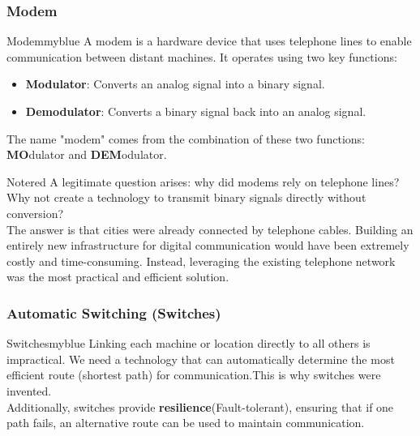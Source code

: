 \vspace{0.25cm}

\subsubsection{Modem}  
\begin{prettyBox}{Modem}{myblue}  
A modem is a hardware device that uses telephone lines to enable communication
between distant machines. It operates using two key functions:  

\begin{itemize}  
    \item \textbf{Modulator}: Converts an analog signal into a binary signal.  
    \item \textbf{Demodulator}: Converts a binary signal back into an analog signal.  
\end{itemize}  

The name "modem" comes from the combination of these two functions:
\textbf{MO}dulator and \textbf{DEM}odulator.  
\end{prettyBox}  

\vspace{0.8cm}

\begin{prettyBox}{Note}{red}  
    A legitimate question arises: why did modems rely on telephone lines? 
Why not create a technology to transmit binary signals directly without conversion?\\[0.2cm]
The answer is that cities were already connected by telephone cables.  
Building an entirely new infrastructure for digital communication would have been extremely costly and time-consuming.  
Instead, leveraging the existing telephone network was the most practical and efficient solution.  
\end{prettyBox}  

\vspace{0.75cm}

\subsubsection{Automatic Switching (Switches)}  
\begin{prettyBox}{Switches}{myblue}  
Linking each machine or location directly to all others is impractical.  
We need a technology that can automatically determine the most efficient route 
(shortest path) for communication.This is why switches were invented.\\[0.15cm]
Additionally, switches provide \textbf{resilience}(Fault-tolerant), ensuring that if one 
path fails, an alternative route can be used to maintain communication.  
\end{prettyBox}  

